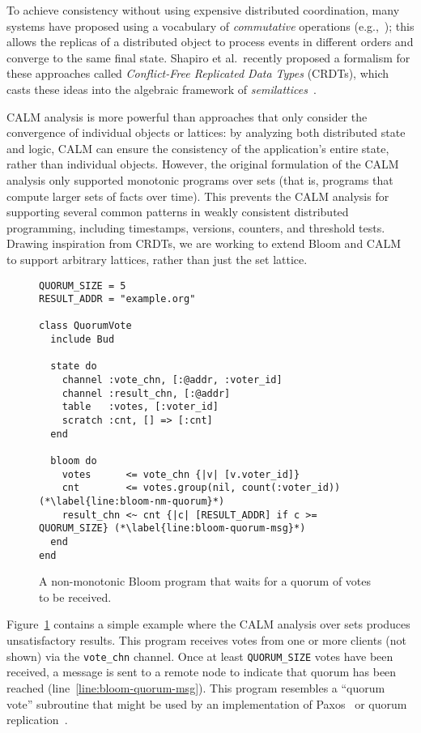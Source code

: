To achieve consistency without using expensive distributed coordination, many
systems have proposed using a vocabulary of \emph{commutative} operations
(e.g.,~\cite{dynamo,Reiher1994,bayou}); this allows the replicas of a distributed
object to process events in different orders and converge to the same final
state. Shapiro et al.\ recently proposed a formalism for these approaches called
\emph{Conflict-Free Replicated Data Types} (CRDTs), which casts these ideas into
the algebraic framework of \emph{semilattices}~\cite{Shapiro2011a,Shapiro2011b}.

CALM analysis is more powerful than approaches that only consider the
convergence of individual objects or lattices: by analyzing both distributed
state and logic, CALM can ensure the consistency of the application's entire
state, rather than individual objects. However, the original formulation of the
CALM analysis only supported monotonic programs over sets (that is, programs
that compute larger sets of facts over time). This prevents the CALM analysis
for supporting several common patterns in weakly consistent distributed
programming, including timestamps, versions, counters, and threshold
tests. Drawing inspiration from CRDTs, we are working to extend Bloom and CALM
to support arbitrary lattices, rather than just the set lattice.

\begin{figure}[t]
\begin{scriptsize}
\begin{lstlisting}
QUORUM_SIZE = 5
RESULT_ADDR = "example.org"

class QuorumVote
  include Bud

  state do
    channel :vote_chn, [:@addr, :voter_id]
    channel :result_chn, [:@addr]
    table   :votes, [:voter_id]
    scratch :cnt, [] => [:cnt]
  end

  bloom do
    votes      <= vote_chn {|v| [v.voter_id]}
    cnt        <= votes.group(nil, count(:voter_id)) (*\label{line:bloom-nm-quorum}*)
    result_chn <~ cnt {|c| [RESULT_ADDR] if c >= QUORUM_SIZE} (*\label{line:bloom-quorum-msg}*)
  end
end
\end{lstlisting}
\end{scriptsize}
\caption{A non-monotonic Bloom program that waits for a quorum of votes to be received.}
\label{fig:bloom-quorum-set}
\end{figure}

Figure~\ref{fig:bloom-quorum-set} contains a simple example where the CALM
analysis over sets produces unsatisfactory results. This program receives votes
from one or more clients (not shown) via the \texttt{vote\_chn} channel. Once at
least \texttt{QUORUM\_SIZE} votes have been received, a message is sent to a
remote node to indicate that quorum has been reached
(line~\ref{line:bloom-quorum-msg}). This program resembles a ``quorum vote''
subroutine that might be used by an implementation of Paxos~\cite{part-time} or
quorum replication~\cite{Gifford1979}.

